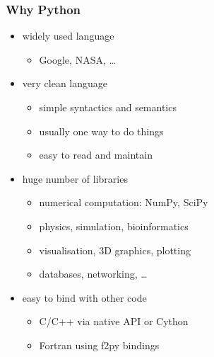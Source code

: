 \documentclass{beamer}
\begin{document}
\begin{frame}[fragile]
    \frametitle{Why Python}

    \begin{itemize}
        \item<1-> widely used language
            \begin{itemize}
                \item Google, NASA, \ldots
            \end{itemize}
        \item<2-> very clean language
            \begin{itemize}
                \item simple syntactics and semantics
                \item usually one way to do things
                \item easy to read and maintain
            \end{itemize}
        \item<3-> huge number of libraries
            \begin{itemize}
                \item numerical computation: NumPy, SciPy
                \item physics, simulation, bioinformatics
                \item visualisation, 3D graphics, plotting
                \item databases, networking, \ldots
            \end{itemize}
        \item<4-> easy to bind with other code
            \begin{itemize}
                \item C/C++ via native API or Cython
                \item Fortran using f2py bindings
            \end{itemize}
    \end{itemize}
\end{frame}
\end{document}
